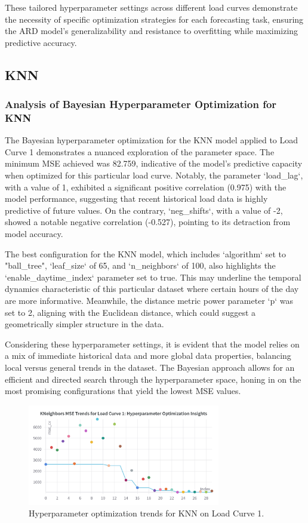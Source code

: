 \documentclass{article} %
\begin{document}
These tailored hyperparameter settings across different load curves demonstrate the necessity of specific optimization strategies for each forecasting task, ensuring the \gls{ARD} model's generalizability and resistance to overfitting while maximizing predictive accuracy.


\subsection{KNN}
\subsubsection{Analysis of Bayesian Hyperparameter Optimization for KNN}

The Bayesian hyperparameter optimization for the \gls{KNN} model applied to Load Curve 1 demonstrates a nuanced exploration of the parameter space. The minimum \gls{MSE} achieved was 82.759, indicative of the model's predictive capacity when optimized for this particular load curve. Notably, the parameter `load\_lag`, with a value of 1, exhibited a significant positive correlation (0.975) with the model performance, suggesting that recent historical load data is highly predictive of future values. On the contrary, `neg\_shifts`, with a value of -2, showed a notable negative correlation (-0.527), pointing to its detraction from model accuracy.

The best configuration for the \gls{KNN} model, which includes `algorithm` set to "ball\_tree", `leaf\_size` of 65, and `n\_neighbors` of 100, also highlights the `enable\_daytime\_index` parameter set to true. This may underline the temporal dynamics characteristic of this particular dataset where certain hours of the day are more informative. Meanwhile, the distance metric power parameter `p` was set to 2, aligning with the Euclidean distance, which could suggest a geometrically simpler structure in the data. 

Considering these hyperparameter settings, it is evident that the model relies on a mix of immediate historical data and more global data properties, balancing local versus general trends in the dataset. The Bayesian approach allows for an efficient and directed search through the hyperparameter space, honing in on the most promising configurations that yield the lowest \gls{MSE} values.

\begin{figure}[H]
    \centering
    \includegraphics[width=0.75\textwidth]{ressources/Hyperparams/KNN/KNeighbors MSE Trends for Load Curve 1 Hyperparameter Optimization Insights.png}
    \caption{Hyperparameter optimization trends for KNN on Load Curve 1.}
    \label{fig:knn_lc1}
\end{figure}
\end{document}
